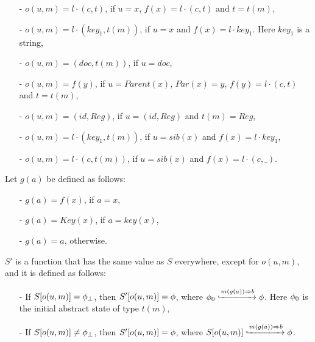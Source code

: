 \begin{itemize}
\setlength{\itemsep}{0.5pt}
\item[-] $o(u,m) = l \cdot (c,t)$, if $u = x$, $f(x) = l \cdot (c,t)$ and $t=t(m)$,

\item[-] $o(u,m) = l \cdot (\mathit{key_1},t(m))$, if $u = x$ and $f(x) = l \cdot \mathit{key}_1$. Here $\mathit{key}_1$ is a string,

\item[-] $o(u,m) = (\mathit{doc},t(m))$, if $u = \mathit{doc}$,

\item[-] $o(u,m) = f(y)$, if $u = \mathit{Parent}(x)$, $\mathit{Par}(x) = y$, $f(y) = l \cdot (c,t)$ and $t = t(m)$,

\item[-] $o(u,m) = (\mathit{id},\mathit{Reg})$, if $u = (\mathit{id},\mathit{Reg})$ and $t(m) = \mathit{Reg}$,

\item[-] $o(u,m) = l \cdot (\mathit{key}_1,t(m))$, if $u = \mathit{sib}(x)$ and $f(x) = l \cdot \mathit{key}_1$,

\item[-] $o(u,m) = l \cdot (c,t(m))$, if $u = \mathit{sib}(x)$ and $f(x) = l \cdot (c,\_)$.
\end{itemize}

Let $g(a)$ be defined as follows:

\begin{itemize}
\setlength{\itemsep}{0.5pt}
\item[-] $g(a) = f(x)$, if $a = x$,

\item[-] $g(a) = Key(x)$, if $a = \mathit{key}(x)$,

\item[-] $g(a) = a$, otherwise.
\end{itemize}

$S'$ is a function that has the same value as $S$ everywhere, except for $o(u,m)$, and it is defined as follows:

\begin{itemize}
\setlength{\itemsep}{0.5pt}
\item[-] If $S[o(u,m)] = \phi_{\bot}$, then $S'[o(u,m)] = \phi$, where $\phi_0 \xhookrightarrow{ m(g(a))\Rightarrow b } \phi$. Here $\phi_0$ is the initial abstract state of type $t(m)$,

\item[-] If $S[o(u,m)] \neq \phi_{\bot}$, then $S'[o(u,m)] = \phi$, where $S[o(u,m)] \xhookrightarrow{ m(g(a))\Rightarrow b } \phi$.
\end{itemize}


